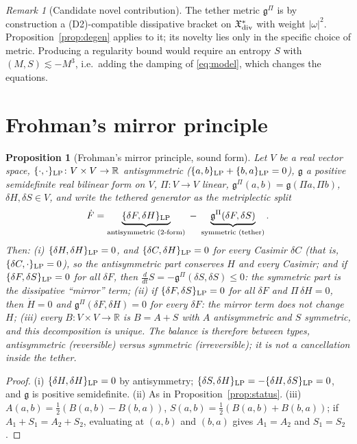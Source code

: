 \documentclass[11pt]{amsart}
\newtheorem{proposition}[theorem]{Proposition}
\theoremstyle{definition}\newtheorem{definition}[theorem]{Definition}
\theoremstyle{remark}\newtheorem{remark}[theorem]{Remark}
\begin{document}
\begin{remark}[Candidate novel contribution]
The tether metric $\mathfrak g^\Pi$ is by construction a (D2)-compatible dissipative bracket on $\mathfrak X^*_{\rm div}$ with weight $|\omega|^2$.
Proposition~\ref{prop:degen} applies to it; its novelty lies only in the specific choice of metric. Producing a regularity bound would require an entropy $S$ with $(M,S)\lesssim -M^3$, i.e.\ adding the damping of \eqref{eq:model}, which changes the equations.
\end{remark}


\section{Frohman's mirror principle}
\begin{proposition}[Frohman's mirror principle, sound form]\label{prop:mirror}
Let $V$ be a real vector space, $\{\cdot,\cdot\}_{\rm LP}\colon V\times V\to\mathbb R$ antisymmetric ($\{a,b\}_{\rm LP}+\{b,a\}_{\rm LP}=0$),
$\mathfrak g$ a positive semidefinite real bilinear form on $V$, $\Pi\colon V\to V$ linear, $\mathfrak g^\Pi(a,b)=\mathfrak g(\Pi a,\Pi b)$,
$\delta H,\delta S\in V$, and write the tethered generator as the metriplectic split
\[ \dot F=\underbrace{\{\delta F,\delta H\}_{\rm LP}}_{\text{antisymmetric (2-form)}}\;-\;\underbrace{\mathfrak g^\Pi(\delta F,\delta S)}_{\text{symmetric (tether)}}. \]
Then:
(i) $\{\delta H,\delta H\}_{\rm LP}=0$, and $\{\delta C,\delta H\}_{\rm LP}=0$ for every Casimir $\delta C$ (that is, $\{\delta C,\cdot\}_{\rm LP}=0$), so the
antisymmetric part conserves $H$ and every Casimir; and if $\{\delta F,\delta S\}_{\rm LP}=0$ for all $\delta F$, then
$\frac{d}{dt}S=-\mathfrak g^\Pi(\delta S,\delta S)\le0$: the symmetric part is the dissipative ``mirror'' term;
(ii) if $\{\delta F,\delta S\}_{\rm LP}=0$ for all $\delta F$ and $\Pi\,\delta H=0$, then $\dot H=0$ and $\mathfrak g^\Pi(\delta F,\delta H)=0$ for every $\delta F$:
the mirror term does not change $H$;
(iii) every $B\colon V\times V\to\mathbb R$ is $B=A+S$ with $A$ antisymmetric and $S$ symmetric, and this decomposition is unique.
The balance is therefore between \emph{types}, antisymmetric (reversible) versus symmetric (irreversible); it is not a cancellation inside the tether.
\end{proposition}
\begin{proof}(i) $\{\delta H,\delta H\}_{\rm LP}=0$ by antisymmetry; $\{\delta S,\delta H\}_{\rm LP}=-\{\delta H,\delta S\}_{\rm LP}=0$, and $\mathfrak g$ is
positive semidefinite. (ii) As in Proposition~\ref{prop:status}. (iii) $A(a,b)=\tfrac12(B(a,b)-B(b,a))$, $S(a,b)=\tfrac12(B(a,b)+B(b,a))$;
if $A_1+S_1=A_2+S_2$, evaluating at $(a,b)$ and $(b,a)$ gives $A_1=A_2$ and $S_1=S_2$.\end{proof}
\end{document}
